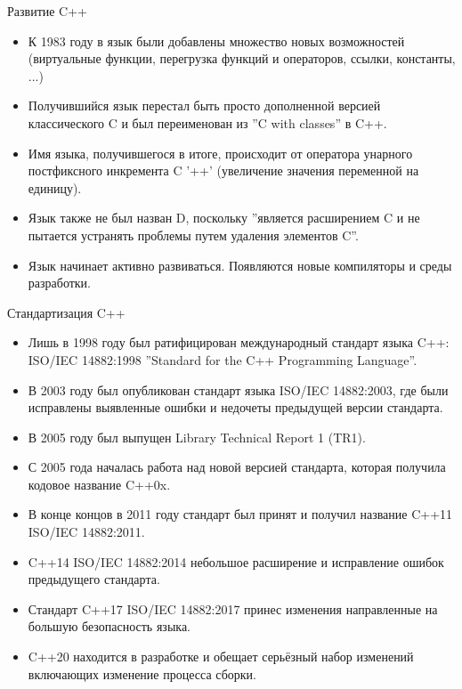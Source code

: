 \documentclass[9pt]{beamer}
\begin{document}
\begin{frame}{Развитие C++}
    \begin{itemize}
        \item К 1983 году в язык были добавлены множество новых
        возможностей (виртуальные функции, перегрузка функций
        и операторов, ссылки, константы, ...)
        \item Получившийся язык перестал быть просто дополненной
        версией классического C и был переименован из ”C with
        classes” в C++.
        \item Имя языка, получившегося в итоге, происходит от оператора
        унарного постфиксного инкремента C ’++’ (увеличение
        значения переменной на единицу).
        \item Язык также не был назван D, поскольку ”является
        расширением C и не пытается устранять проблемы путем
        удаления элементов C”.
        \item Язык начинает активно развиваться. Появляются новые
        компиляторы и среды разработки.
    \end{itemize}
\end{frame}
\begin{frame}{Стандартизация C++}
    \begin{itemize}
        \item Лишь в 1998 году был ратифицирован международный
        стандарт языка C++: ISO/IEC 14882:1998 ”Standard for the
        C++ Programming Language”.
        \item В 2003 году был опубликован стандарт языка ISO/IEC
        14882:2003, где были исправлены выявленные ошибки и
        недочеты предыдущей версии стандарта.
        \item В 2005 году был выпущен Library Technical Report 1 (TR1).
        \item С 2005 года началась работа над новой версией стандарта,
        которая получила кодовое название C++0x.
        \item В конце концов в 2011 году стандарт был принят и получил
        название C++11 ISO/IEC 14882:2011.
        \item C++14 ISO/IEC 14882:2014 небольшое расширение и
        исправление ошибок предыдущего стандарта.
        \item Стандарт C++17 ISO/IEC 14882:2017 принес изменения
        направленные на большую безопасность языка.
        \item C++20 находится в разработке и обещает серьёзный набор
        изменений включающих изменение процесса сборки.
    \end{itemize}
\end{frame}
\end{document}
